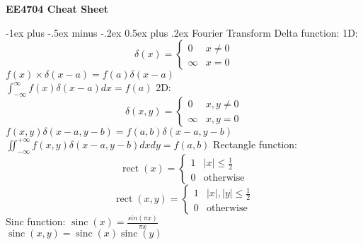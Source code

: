 \documentclass[dvipdfmx,a4paper,10pt,landscape]{article}
\makeatletter
\renewcommand{\section}{\@startsection{section}{1}{0mm}%
                                {-1ex plus -.5ex minus -.2ex}%
                                {0.5ex plus .2ex}%
                                {\normalfont\large\bfseries}}
\DeclareMathOperator{\sinc}{sinc}
\DeclareMathOperator{\rect}{rect}
\makeatother
\begin{document}
\raggedright
\footnotesize

\begin{center}
    \Large{\textbf{EE4704 Cheat Sheet}} \\
\end{center}
\begin{multicols}{3}
    \setlength{\premulticols}{1pt}
    \setlength{\postmulticols}{1pt}
    \setlength{\multicolsep}{1pt}
    \setlength{\columnsep}{2pt}

    \section{Fourier Transform}
    Delta function:
    1D:
    \begin{equation*}
        \delta(x)=
        \begin{cases}
            0      & x \neq 0 \\
            \infty & x = 0
        \end{cases}
    \end{equation*}
    $f(x)\times\delta(x-a)=f(a)\delta(x-a)$ \\
    $\int_{-\infty}^{\infty}f(x)\delta(x-a)dx=f(a)$
    2D:
    \begin{equation*}
        \delta(x,y)=
        \begin{cases}
            0      & x,y \neq 0 \\
            \infty & x,y = 0
        \end{cases}
    \end{equation*}
    $    f(x,y)\delta(x-a,y-b)=f(a,b)\delta(x-a,y-b)$ \\
    $\iint_{-\infty}^{+\infty}f(x,y)\delta(x-a,y-b)dxdy=f(a,b)
    $
    Rectangle function:
    \begin{equation*}
        \rect(x)   =
        \begin{cases}
            1 & |x|\leq\frac{1}{2} \\
            0 & \text{otherwise}
        \end{cases}
    \end{equation*}
    \begin{equation*}
        \rect(x,y) =
        \begin{cases}
            1 & |x|,|y|\leq\frac{1}{2} \\
            0 & \text{otherwise}
        \end{cases}
    \end{equation*}
    Sinc function:
    $
        \sinc(x)    =\frac{sin(\pi x)}{\pi x}     $                          \\
    $\sinc(x,y)  = \sinc(x)\sinc(y)
    $


\end{multicols}
\end{document}

